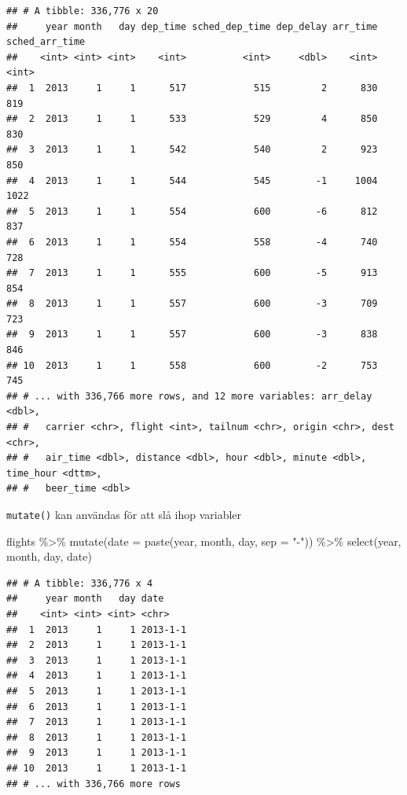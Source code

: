 \documentclass[
]{book}
\newenvironment{Shaded}{\begin{snugshade}}{\end{snugshade}}
\newcommand{\AttributeTok}[1]{\textcolor[rgb]{0.77,0.63,0.00}{#1}}
\newcommand{\FunctionTok}[1]{\textcolor[rgb]{0.00,0.00,0.00}{#1}}
\newcommand{\NormalTok}[1]{#1}
\newcommand{\SpecialCharTok}[1]{\textcolor[rgb]{0.00,0.00,0.00}{#1}}
\newcommand{\StringTok}[1]{\textcolor[rgb]{0.31,0.60,0.02}{#1}}
\begin{document}
\begin{verbatim}
## # A tibble: 336,776 x 20
##     year month   day dep_time sched_dep_time dep_delay arr_time sched_arr_time
##    <int> <int> <int>    <int>          <int>     <dbl>    <int>          <int>
##  1  2013     1     1      517            515         2      830            819
##  2  2013     1     1      533            529         4      850            830
##  3  2013     1     1      542            540         2      923            850
##  4  2013     1     1      544            545        -1     1004           1022
##  5  2013     1     1      554            600        -6      812            837
##  6  2013     1     1      554            558        -4      740            728
##  7  2013     1     1      555            600        -5      913            854
##  8  2013     1     1      557            600        -3      709            723
##  9  2013     1     1      557            600        -3      838            846
## 10  2013     1     1      558            600        -2      753            745
## # ... with 336,766 more rows, and 12 more variables: arr_delay <dbl>,
## #   carrier <chr>, flight <int>, tailnum <chr>, origin <chr>, dest <chr>,
## #   air_time <dbl>, distance <dbl>, hour <dbl>, minute <dbl>, time_hour <dttm>,
## #   beer_time <dbl>
\end{verbatim}

\texttt{mutate()} kan användas för att slå ihop variabler

\begin{Shaded}
\begin{Highlighting}[]
\NormalTok{flights }\SpecialCharTok{\%\textgreater{}\%} 
  \FunctionTok{mutate}\NormalTok{(}\AttributeTok{date =} \FunctionTok{paste}\NormalTok{(year, month, day, }\AttributeTok{sep =} \StringTok{"{-}"}\NormalTok{)) }\SpecialCharTok{\%\textgreater{}\%} 
  \FunctionTok{select}\NormalTok{(year, month, day, date)}
\end{Highlighting}
\end{Shaded}

\begin{verbatim}
## # A tibble: 336,776 x 4
##     year month   day date    
##    <int> <int> <int> <chr>   
##  1  2013     1     1 2013-1-1
##  2  2013     1     1 2013-1-1
##  3  2013     1     1 2013-1-1
##  4  2013     1     1 2013-1-1
##  5  2013     1     1 2013-1-1
##  6  2013     1     1 2013-1-1
##  7  2013     1     1 2013-1-1
##  8  2013     1     1 2013-1-1
##  9  2013     1     1 2013-1-1
## 10  2013     1     1 2013-1-1
## # ... with 336,766 more rows
\end{verbatim}
\end{document}
